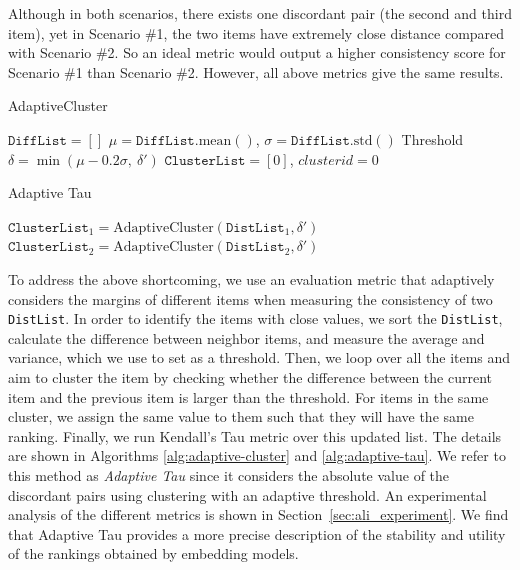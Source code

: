 Although in both scenarios, there exists one discordant pair (the second and third item), yet in Scenario \#1, the two items have extremely close distance compared with Scenario \#2. So an ideal metric would output a higher consistency score for Scenario \#1 than Scenario \#2. However, all above metrics give the same results.


\begin{algorithm}[t]
\small
\caption{AdaptiveCluster}
\label{alg:adaptive-cluster}
\BlankLine
$\texttt{DiffList} = []$\;
$\mu=\texttt{DiffList}.\text{mean}()$, $\sigma=\texttt{DiffList}.\text{std}()$\;
Threshold $\delta=\min(\mu-0.2\sigma,\: \delta')$\;
$\texttt{ClusterList}=[0]$, $clusterid=0$\;
\;
\end{algorithm}

\begin{algorithm}[t]
\small
\caption{Adaptive Tau}
\label{alg:adaptive-tau}
\BlankLine
$\texttt{ClusterList}_1=\text{AdaptiveCluster}(\texttt{DistList}_1, \delta')$\;
$\texttt{ClusterList}_2=\text{AdaptiveCluster}(\texttt{DistList}_2, \delta')$\;
\;
\end{algorithm}

To address the above shortcoming, we use an evaluation metric that adaptively considers the margins of different items when measuring the consistency of two \texttt{DistList}. In order to identify the items with close values, we sort the \texttt{DistList}, calculate the difference between neighbor items, and measure the average and variance, which we use to set as a threshold. Then, we loop over all the items and aim to cluster the item by checking whether the difference between the current item and the previous item is larger than the threshold. 
For items in the same cluster, we assign the same value to them such that they will have the same ranking. Finally, we run Kendall's Tau metric over this updated list. The details are shown in Algorithms \ref{alg:adaptive-cluster} and \ref{alg:adaptive-tau}.
We refer to this method as \emph{Adaptive Tau} since it considers the absolute value of the discordant pairs using clustering with an adaptive threshold. An experimental analysis of the different metrics is shown in Section~\ref{sec:ali_experiment}. We find that Adaptive Tau provides a more precise description of the stability and utility of the rankings obtained by embedding models.

